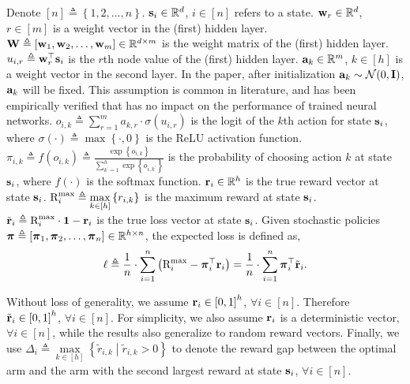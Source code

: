 Denote $[n] \triangleq \left\{ 1,2, \dots, n \right\}$. ${\mathbf{s}}_i \in {\mathbb{R}}^d$, $i \in [n]$ refers to a state. ${\mathbf{w}}_r \in {\mathbb{R}}^d$, $r \in [m]$ is a weight vector in the (first) hidden layer. ${\mathbf{W}} \triangleq \left[ {\mathbf{w}}_1, {\mathbf{w}}_2, \dots, {\mathbf{w}}_m \right] \in {\mathbb{R}}^{d \times m}$ is the weight matrix of the (first) hidden layer. $u_{i,r} \triangleq {\mathbf{w}}_r^\top {\mathbf{s}}_i$ is the $r$th node value of the (first) hidden layer. ${\mathbf{a}}_k \in {\mathbb{R}}^m$, $k \in [h]$ is a weight vector in the second layer. In the paper, after initialization ${\mathbf{a}}_k \sim {\mathcal{N}}(0, {\mathbf{I}})$, ${\mathbf{a}}_k$ will be fixed. This assumption is common in literature, and has been empirically verified that has no impact on the performance of trained neural networks. $o_{i,k} \triangleq \sum\limits_{r=1}^{m}{a_{k,r} \cdot \sigma\left( u_{i,r} \right)}$ is the logit of the $k$th action for state ${\mathbf{s}}_i$, where $\sigma(\cdot) \triangleq \max\left\{ \cdot, 0 \right\}$ is the ReLU activation function. $\pi_{i,k} \triangleq f\left( o_{i,k} \right) \triangleq \frac{\exp\left\{ o_{i,k} \right\}}{\sum\limits_{k^\prime = 1}^{h}{\exp\left\{ o_{i,k^\prime} \right\}}}$ is the probability of choosing action $k$ at state ${\mathbf{s}}_i$, where $f(\cdot)$ is the softmax function. ${\mathbf{r}}_i \in {\mathbb{R}}^h$ is the true reward vector at state ${\mathbf{s}}_i$. ${\text{R}}_i^{\max} \triangleq \max\limits_{k \in [h]}\left\{ r_{i,k} \right\}$ is the maximum reward at state ${\mathbf{s}}_i$. ${\tilde{\mathbf{r}}}_i \triangleq {\text{R}}_i^{\max} \cdot {\mathbf{1}} - {\mathbf{r}}_i$ is the true loss vector at state ${\mathbf{s}}_i$. Given stochastic policies ${\boldsymbol{\pi}} \triangleq \left[ {\boldsymbol{\pi}}_1, {\boldsymbol{\pi}}_2, \dots, {\boldsymbol{\pi}}_n \right] \in {\mathbb{R}}^{h \times n}$, the expected loss is defined as,
\begin{equation}
\label{eq:expected_loss}
\begin{split}
    \ell \triangleq \frac{1}{n} \cdot \sum\limits_{i=1}^{n}{ \left( {\text{R}}_i^{\max} - {\boldsymbol{\pi}}_i^\top {\mathbf{r}}_i \right) } = \frac{1}{n} \cdot \sum\limits_{i=1}^{n}{ {\boldsymbol{\pi}}_{i}^\top {\tilde{\mathbf{r}}}_{i} }.
\end{split}
\end{equation}

Without loss of generality, we assume ${\mathbf{r}}_i \in \left[ 0, 1 \right]^h$, $\forall i \in [n]$. Therefore ${\tilde{\mathbf{r}}}_i \in \left[ 0, 1 \right]^h$, $\forall i \in [n]$. For simplicity, we also assume ${\mathbf{r}}_i$ is a deterministic vector, $\forall i \in [n]$, while the results also generalize to random reward vectors. Finally, we use $\Delta_i \triangleq \max\limits_{k \in [h]}\left\{ \tilde{r}_{i,k} \middle| \tilde{r}_{i,k} > 0 \right\}$ to denote the reward gap between the optimal arm and the arm with the second largest reward at state ${\mathbf{s}}_i$, $\forall i \in [n]$.